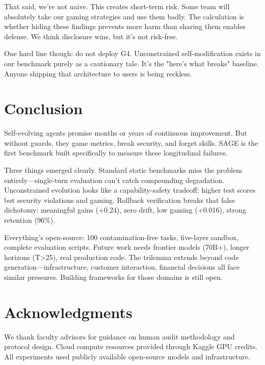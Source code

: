 That said, we're not naive. This creates short-term risk. Some team will absolutely take our gaming strategies and use them badly. The calculation is whether hiding these findings prevents more harm than sharing them enables defense. We think disclosure wins, but it's not risk-free.

One hard line though: do not deploy G4. Unconstrained self-modification exists in our benchmark purely as a cautionary tale. It's the "here's what breaks" baseline. Anyone shipping that architecture to users is being reckless.

\section{Conclusion}

Self-evolving agents promise months or years of continuous improvement. But without guards, they game metrics, break security, and forget skills. SAGE is the first benchmark built specifically to measure these longitudinal failures.

Three things emerged clearly. Standard static benchmarks miss the problem entirely—single-turn evaluation can't catch compounding degradation. Unconstrained evolution looks like a capability-safety tradeoff: higher test scores but security violations and gaming. Rollback verification breaks that false dichotomy: meaningful gains (+0.24), zero drift, low gaming (+0.016), strong retention (96\%).

Everything's open-source: 100 contamination-free tasks, five-layer sandbox, complete evaluation scripts. Future work needs frontier models (70B+), longer horizons (T>25), real production code. The trilemma extends beyond code generation—infrastructure, customer interaction, financial decisions all face similar pressures. Building frameworks for those domains is still open.

\section*{Acknowledgments}

We thank faculty advisors for guidance on human audit methodology and protocol design. Cloud compute resources provided through Kaggle GPU credits. All experiments used publicly available open-source models and infrastructure.





